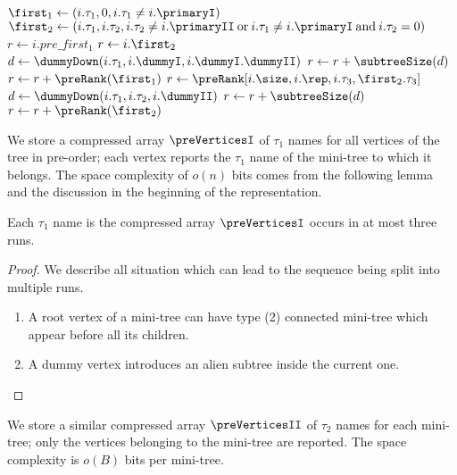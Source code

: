 \begin{algorithm}
\begin{algorithmic}
	\State $\first_1 \gets (i.\tau_1, 0, i.\tau_1 \ne i.\primaryI)$
	\State $\first_2 \gets (i.\tau_1, i.\tau_2, i.\tau_2 \ne i.\primaryII \boolor i.\tau_1 \ne i.\primaryI \booland i.\tau_2 = 0)$
	 
		\State $r \gets i.pre\_first_1$
	 
		\State $r \gets i.\first_2$
			\State $d \gets \dummyDown(i.\tau_1, i.\dummyI, i.\dummyI.\dummyII)$
			\State $r \gets r + \subtreeSize(d)$ 
		\EndIf
		\State $r \gets r + \preRank(\first_1)$
	\Else {}
		\State $r \gets \preRank[i.\size, i.\rep, i.\tau_3, \first_2.\tau_3]$
			\State $d \gets \dummyDown(i.\tau_1, i.\tau_2, i.\dummyII)$
			\State $r \gets r + \subtreeSize(d)$ 
		\EndIf
		\State $r \gets r + \preRank(\first_2)$
	\EndIf
	
	\State {}
\EndFunction
\end{algorithmic}
\end{algorithm}

We store a compressed array $\preVerticesI$ of $\tau_1$ names for all vertices of the tree in pre-order; each vertex reports the $\tau_1$ name of the mini-tree to which it belongs.
The space complexity of $o(n)$ bits comes from the following lemma and the discussion in the beginning of the representation.

\begin{lemma}
	Each $\tau_1$ name is the compressed array $\preVerticesI$ occurs in at most three runs.
\end{lemma}
\begin{proof}
	We describe all situation which can lead to the sequence being split into multiple runs.
	\begin{enumerate}
		\item A root vertex of a mini-tree can have type (2) connected mini-tree which appear before all its children.
		\item A dummy vertex introduces an alien subtree inside the current one.
	\end{enumerate}
\end{proof}

We store a similar compressed array $\preVerticesII$ of $\tau_2$ names for each mini-tree; only the vertices belonging to the mini-tree are reported.
The space complexity is $o(B)$ bits per mini-tree.

